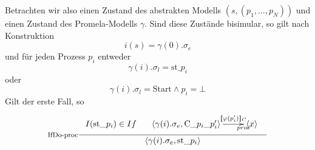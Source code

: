 Betrachten wir also einen Zustand des abstrakten Modells $(s,(p_1,\dots,p_N))$ und einen Zustand des Promela-Modells $\gamma$.
Sind diese Zustände bisimular, so gilt nach Konstruktion
\[ i(s) = \gamma(0).\sigma_e \]
und für jeden Prozess $p_i$ entweder
\[ \gamma(i).\sigma_l = \textrm{st\_}p_i \]
oder
\[ \gamma(i).\sigma_l = \textrm{Start} \land p_i = \bot \]
Gilt der erste Fall, so
\[ \inference[IfDo-proc]{
  I(\textrm{st\_}p_i)\in If &
  \xymatrix{ \left<\gamma(i).\sigma_e,\textrm{C\_}p_i\textrm{\_}p_i'\right>\ar[r]^-{\llbracket \varphi(p_i')\rrbracket_C}_>{proc} & \left< x \right>}
  }
  {\left<\gamma(i).\sigma_e,\textrm{st\_}p_i\right>}
\]

